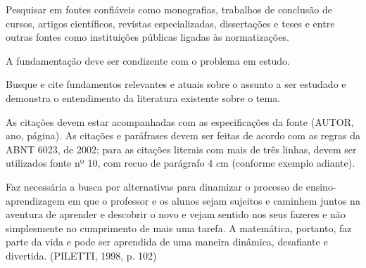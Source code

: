 Pesquisar em fontes confiáveis como monografias, trabalhos de conclusão de
cursos, artigos científicos, revistas especializadas, dissertações e teses e entre outras fontes
como instituições públicas ligadas às normatizações.

A fundamentação deve ser condizente com o problema em estudo.

Busque e cite fundamentos relevantes e atuais sobre o assunto a ser estudado e
demonstra o entendimento da literatura existente sobre o tema.

As citações devem estar acompanhadas com as especificações da fonte (AUTOR,
ano, página). As citações e paráfrases devem ser feitas de acordo com as regras da ABNT
6023, de 2002; para as citações literais com mais de três linhas, devem ser utilizados fonte
nº 10, com recuo de parágrafo 4 cm (conforme exemplo adiante).

\begin{citacao}

Faz necessária a busca por alternativas para dinamizar o processo de ensino-
aprendizagem em que o professor e os alunos sejam sujeitos e caminhem juntos na aventura de aprender e descobrir o novo e vejam sentido nos seus fazeres e não simplesmente no cumprimento de mais uma tarefa. A matemática, portanto, faz
parte da vida e pode ser aprendida de uma maneira dinâmica, desafiante e
divertida. (PILETTI, 1998, p. 102)

\end{citacao}

